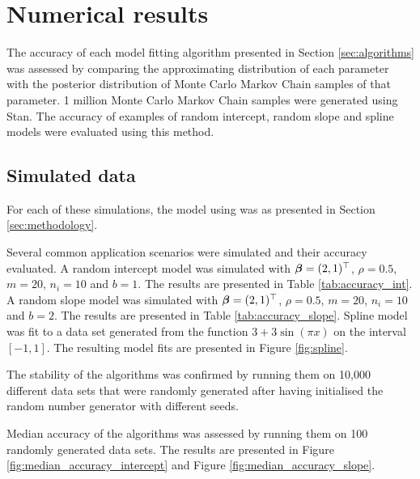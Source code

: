 \documentclass{article}[12pt]
\begin{document}

\section{Numerical results}
\label{sec:results}

The accuracy of each model fitting algorithm presented in Section \ref{sec:algorithms} was assessed by
comparing the approximating distribution of each parameter with the posterior distribution of Monte Carlo
Markov Chain samples of that parameter. 1 million Monte Carlo Markov Chain samples were generated using Stan.
The accuracy of examples of random intercept, random slope and spline models were evaluated using this method.

\subsection{Simulated data}

For each of these simulations, the model using was as presented in Section \ref{sec:methodology}.

Several common application scenarios were simulated and their accuracy evaluated. A random intercept model was
simulated with ${\boldsymbol \beta} = (2, 1)^\top$, $\rho = 0.5$, $m = 20$, $n_i = 10$ and $b = 1$. The results are
presented in Table \ref{tab:accuracy_int}. A random slope model was simulated with ${\boldsymbol \beta} = (2, 1)^\top$,
$\rho = 0.5$, $m = 20$, $n_i = 10$ and $b = 2$. The results are presented in Table \ref{tab:accuracy_slope}.
Spline model was fit to a data set generated from the function $3 + 3 \sin{(\pi x)}$ on the interval $[-1,
1]$. The resulting model fits are presented in Figure \ref{fig:spline}.

The stability of the algorithms was confirmed by running them on 10,000 different data sets that were randomly
generated after having initialised the random number generator with different seeds.

Median accuracy of the algorithms was assessed by running them on 100 randomly generated data sets. The
results are presented in Figure \ref{fig:median_accuracy_intercept} and Figure
\ref{fig:median_accuracy_slope}.
\end{document}
